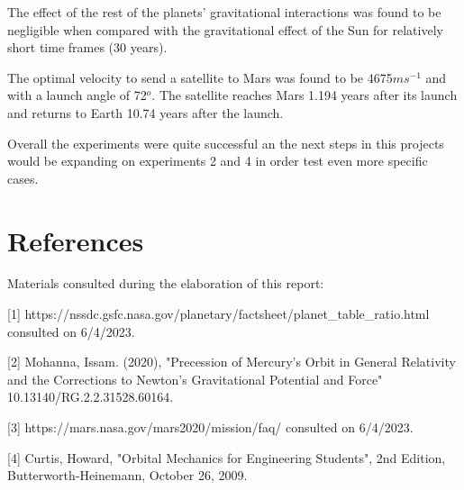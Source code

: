 \documentclass{article}
\begin{document}
{The effect of the rest of the planets' gravitational interactions was found to be negligible when compared with the gravitational effect of the Sun for relatively short time frames (30 years). }

{The optimal velocity to send a satellite to Mars was found to be 4675$ms^{-1}$ and with a launch angle of 72$^o$. The satellite reaches Mars 1.194 years after its launch and returns to Earth 10.74 years after the launch. }

{Overall the experiments were quite successful an the next steps in this projects would be expanding on experiments 2 and 4 in order test even more specific cases. }



\newpage

\section{References}

{Materials consulted during the elaboration of this report:}

{[1] https://nssdc.gsfc.nasa.gov/planetary/factsheet/planet\_table\_ratio.html consulted on 6/4/2023.}

{[2] Mohanna, Issam. (2020), "Precession of Mercury's Orbit in General Relativity and the Corrections to Newton's Gravitational Potential and Force" 10.13140/RG.2.2.31528.60164. }

{[3] https://mars.nasa.gov/mars2020/mission/faq/ consulted on 6/4/2023. }

{[4] Curtis, Howard, "Orbital Mechanics for Engineering Students", 2nd Edition, Butterworth-Heinemann, October 26, 2009. }
\end{document}
